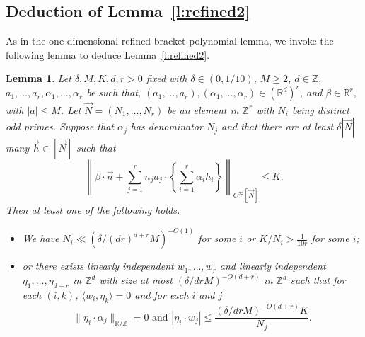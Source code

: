 \documentclass[11pt, a4paper]{amsart}
\theoremstyle{plain}
\theoremstyle{plain}
\newtheorem{lemma}{Lemma}
\theoremstyle{definition}
\theoremstyle{remark}
\numberwithin{equation}{section}
\numberwithin{lemma}{section}
\numberwithin{proposition}{section}
\numberwithin{corollary}{section}
\numberwithin{definition}{section}
\numberwithin{claim}{section}
\begin{document}
\subsection{Deduction of Lemma~\ref{l:refined2}}
As in the one-dimensional refined bracket polynomial lemma, we invoke the following lemma to deduce Lemma~\ref{l:refined2}.
\begin{lemma}\label{l:easierrefined2}
Let $\delta, M, K, d, r > 0$ fixed with $\delta \in (0, 1/10)$, $M \ge 2$, $d \in \mathbb{Z}$, $a_1, \dots, a_r, \alpha_1, \dots, \alpha_r$ be such that, $(a_1, \dots, a_r), (\alpha_1, \dots, \alpha_r) \in (\mathbb{R}^d)^r$, and $\beta \in \mathbb{R}^r$, with $|a| \le M$. Let $\vec{N} = (N_1, \dots, N_r)$ be an element in $\mathbb{Z}^r$ with $N_i$ being distinct odd primes. Suppose that $\alpha_j$ has denominator $N_j$ and that there are at least $\delta |\vec{N}|$ many $\vec{h} \in [\vec{N}]$ such that
$$\left\|\beta \cdot \vec{n} +  \sum_{j = 1}^r n_j a_j \cdot \left\{\sum_{i = 1}^r \alpha_i h_i\right\}\right\|_{C^\infty[\vec{N}]} \le K.$$
Then at least one of the following holds.
    \begin{itemize}
        \item We have $N_i \ll (\delta/(dr)^{d + r}M)^{-O(1)}$ for some $i$ or $K/N_i > \frac{1}{10r}$ for some $i$;
        \item or there exists linearly independent $w_1, \dots, w_r$ and linearly independent $\eta_1, \dots, \eta_{d - r}$ in $\mathbb{Z}^{d}$ with size at most $(\delta/drM)^{-O(d + r)}$ in $\mathbb{Z}^{d}$ such that for each $(i, k)$, $\langle w_i, \eta_k \rangle = 0$ and for each $i$ and $j$
    $$\|\eta_i \cdot \alpha_j\|_{\mathbb{R}/\mathbb{Z}} = 0 \text{ and } |\eta_i \cdot w_j| \le \frac{(\delta/drM)^{-O(d + r)}K}{N_j}.$$
    \end{itemize}
\end{lemma}
\end{document}
